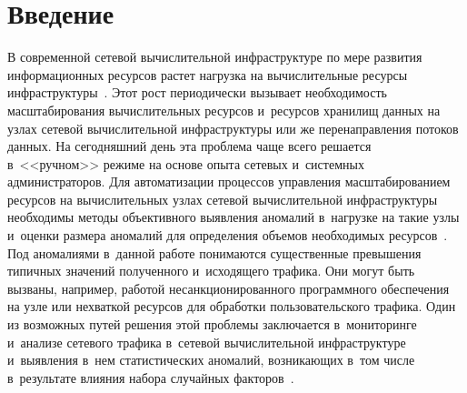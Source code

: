 
  



\thispagestyle{headings}

\begin{multicols}{2}

\label{st\stat}

\section{Введение}

В современной сетевой вы\-чис\-ли\-тель\-ной 
инфраструктуре по мере развития 
информационных ресурсов рас\-тет на\-груз\-ка на вы\-чис\-ли\-тель\-ные ресурсы 
инфраструктуры~\cite{Smeliansky2023,Smeliansky2019}. Этот рост периодически вызывает не\-об\-хо\-ди\-мость мас\-шта\-би\-ро\-ва\-ния 
вы\-чис\-ли\-тель\-ных ресурсов и~ресурсов хранилищ данных на узлах сетевой 
вы\-чис\-ли\-тель\-ной инфраструктуры или же пе\-ре\-на\-прав\-ле\-ния потоков данных. На 
се\-год\-няш\-ний день эта проб\-ле\-ма чаще всего решается в~<<руч\-ном>> режиме на основе 
опыта сетевых и~сис\-тем\-ных администраторов. Для 
автоматизации процессов 
управ\-ле\-ния мас\-шта\-би\-ро\-ва\-ни\-ем ресурсов на вы\-чис\-ли\-тель\-ных узлах сетевой 
вы\-чис\-ли\-тель\-ной инфраструктуры необходимы методы объективного вы\-яв\-ле\-ния аномалий 
в~на\-груз\-ке на такие узлы и~оцен\-ки размера аномалий для определения объемов 
необходимых ресурсов~\cite{Rossem2017,Malak2021,Mesodiakaki2022,Zhang2022}. Под аномалиями 
в~данной работе понимаются существенные превышения 
ти\-пич\-ных значений полученного и~исходящего трафика. Они могут быть вызва\-ны, 
например, работой несанкционированного программного обеспечения на узле или 
не\-хват\-кой ресурсов для обработки пользовательского трафика. Один из воз\-мож\-ных 
путей решения этой проб\-ле\-мы заключается в~мониторинге и~анализе сетевого трафика в~сетевой вы\-чис\-ли\-тель\-ной 
инфраструктуре и~выявления в~нем ста\-ти\-сти\-че\-ских 
аномалий, воз\-ни\-ка\-ющих в~том чис\-ле в~результате влияния набора случайных 
факторов~\cite{Hosseinzadeh2020,Abood2021}.

\begin{figure*}[b] %
  \vspace*{1pt}
\begin{center}
   \mbox{%
\epsfxsize=151.725mm 
}
\end{center}
\vspace*{-9pt}
    \label{some_machine_example}
\end{figure*}


\end{multicols}
